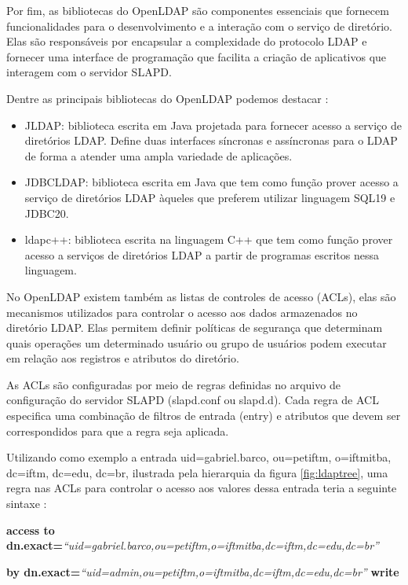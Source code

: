 Por fim, as bibliotecas do OpenLDAP são componentes essenciais que fornecem funcionalidades para o desenvolvimento e a interação com o serviço de diretório. Elas são responsáveis por encapsular a complexidade do protocolo LDAP e fornecer uma interface de programação que facilita a criação de aplicativos que interagem com o servidor SLAPD.

Dentre as principais bibliotecas do OpenLDAP podemos destacar
\cite{universidade-fumec}:

\begin{itemize}
    \item JLDAP: biblioteca escrita em Java projetada para fornecer acesso a
    serviço de diretórios LDAP. Define duas interfaces síncronas e assíncronas
    para o LDAP de forma a atender uma ampla variedade de aplicações.
    \item JDBCLDAP: biblioteca escrita em Java que tem como função prover
    acesso a serviço de diretórios LDAP àqueles que preferem utilizar
    linguagem SQL19 e JDBC20.
    \item ldapc++: biblioteca escrita na linguagem C++ que tem como função
    prover acesso a serviços de diretórios LDAP a partir de programas escritos
    nessa linguagem.
\end{itemize}

No OpenLDAP existem também as listas de controles de acesso (ACLs), elas são mecanismos utilizados para controlar o acesso aos dados armazenados no diretório LDAP. Elas permitem definir políticas de segurança que determinam quais operações um determinado usuário ou grupo de usuários podem executar em relação aos registros e atributos do diretório.

As ACLs são configuradas por meio de regras definidas no arquivo de configuração do servidor SLAPD (slapd.conf ou slapd.d). Cada regra de ACL especifica uma combinação de filtros de entrada (entry) e atributos que devem ser correspondidos para que a regra seja aplicada.

Utilizando como exemplo a entrada uid=gabriel.barco, ou=petiftm, o=iftmitba, dc=iftm, dc=edu, dc=br, ilustrada pela hierarquia da figura \ref{fig:ldaptree}, uma regra nas ACLs para controlar o acesso aos valores dessa entrada teria
a seguinte sintaxe \cite{oliveira2010}:

\textbf{access to dn.exact=}\textit{“uid=gabriel.barco,ou=petiftm,o=iftmitba,dc=iftm,dc=edu,dc=br”}

\textbf{by dn.exact=}\textit{“uid=admin,ou=petiftm,o=iftmitba,dc=iftm,dc=edu,dc=br”} \textbf{write}

